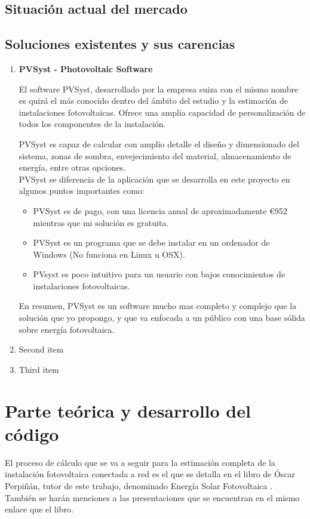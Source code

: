 \documentclass[11pt]{report}
\begin{document}
\section{Situación actual del mercado}

\section{Soluciones existentes y sus carencias} \label{existing_solutions}
\begin{enumerate}
\item \textbf{PVSyst - Photovoltaic Software}

El software PVSyst, desarrollado por la empresa suiza con el mismo nombre es quizá el más conocido dentro del ámbito del estudio y la estimación de instalaciones fotovoltaicas. Ofrece una amplia capacidad de personalización de todos los componentes de la instalación.

PVSyst es capaz de calcular con amplio detalle el diseño y dimensionado del sistema, zonas de sombra, envejecimiento del material, almacenamiento de energía, entre otras opciones.\\

PVSyst se diferencia de la aplicación que se desarrolla en este proyecto en algunos puntos importantes como:
	\begin{itemize}
		\item PVSyst es de pago, con una licencia anual de aproximadamente \euro{952} mientras que mi solución es gratuita.
		\item PVSyst es un programa que se debe instalar en un ordenador de Windows (No funciona en Linux u OSX).
		\item PVsyst es poco intuitivo para un usuario con bajos conocimientos de instalaciones fotovoltaicas.
	\end{itemize}
En resumen, PVSyst es un software mucho mas completo y complejo que la solución que yo propongo, y que va enfocada a un público con una base sólida sobre energía fotovoltaica.
\item Second item
\item Third item
\end{enumerate}


\chapter{Parte teórica y desarrollo del código}
\label{sec:theory}

El proceso de cálculo que se va a seguir para la estimación completa de la instalación fotovoltaica conectada a red es el que se detalla en el libro de Óscar Perpiñán, tutor de este trabajo, denominado Energía Solar Fotovoltaica \cite{esf_book}. También se harán menciones a las presentaciones que se encuentran en el mismo enlace que el libro.\\
\end{document}
